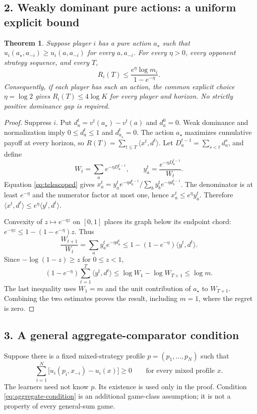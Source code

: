 \documentclass[11pt]{article}
\newtheorem{theorem}{Theorem}
\newcommand{\ip}[2]{\langle #1,#2\rangle}
\begin{document}
\subsection*{2. Weakly dominant pure actions: a uniform explicit bound}

\begin{theorem}\label{thm:dominance}
Suppose player $i$ has a pure action $a_\star$ such that
$u_i(a_\star,a_{-i})\geq u_i(a,a_{-i})$ for every $a,a_{-i}$.
For every $\eta>0$, every opponent strategy sequence, and every $T$,
\[
 R_i(T)\leq\frac{e^\eta\log m_i}{1-e^{-\eta}}.
\]
Consequently, if each player has such an action, the common explicit choice
$\eta=\log2$ gives $R_i(T)\leq4\log K$ for every player and horizon.
No strictly positive dominance gap is required.
\end{theorem}

\begin{proof}
Suppress $i$. Put $d_a^t=v^t(a_\star)-v^t(a)$ and $d_a^0=0$.
Weak dominance and normalization imply $0\leq d_a^t\leq1$ and
$d_{a_\star}^t=0$. The action $a_\star$ maximizes cumulative payoff at
every horizon, so $R(T)=\sum_{t\leq T}\ip{x^t}{d^t}$.
Let $D_a^{t-1}=\sum_{s<t}d_a^s$, and define
\[
 W_t=\sum_a e^{-\eta D_a^{t-1}},\qquad
 y_a^t=\frac{e^{-\eta D_a^{t-1}}}{W_t}.
\]
Equation \eqref{eq:telescoped} gives
$x_a^t=y_a^t e^{-\eta d_a^{t-1}}/\sum_b y_b^t e^{-\eta d_b^{t-1}}$.
The denominator is at least $e^{-\eta}$ and the numerator factor at most
one, hence $x_a^t\leq e^\eta y_a^t$. Therefore
$\ip{x^t}{d^t}\leq e^\eta\ip{y^t}{d^t}$.

Convexity of $z\mapsto e^{-\eta z}$ on $[0,1]$ places its graph below its
endpoint chord: $e^{-\eta z}\leq1-(1-e^{-\eta})z$. Thus
\[
 \frac{W_{t+1}}{W_t}=\sum_a y_a^t e^{-\eta d_a^t}
 \leq1-(1-e^{-\eta})\ip{y^t}{d^t}.
\]
Since $-\log(1-z)\geq z$ for $0\leq z<1$,
\[
 (1-e^{-\eta})\sum_{t=1}^T\ip{y^t}{d^t}
 \leq\log W_1-\log W_{T+1}\leq\log m.
\]
The last inequality uses $W_1=m$ and the unit contribution of
$a_\star$ to $W_{T+1}$. Combining the two estimates proves the result,
including $m=1$, where the regret is zero.
\end{proof}

\subsection*{3. A general aggregate-comparator condition}
Suppose there is a fixed mixed-strategy profile $p=(p_1,\ldots,p_N)$
such that
\begin{equation}\label{eq:aggregate-condition}
 \sum_{i=1}^N\bigl[u_i(p_i,x_{-i})-u_i(x)\bigr]\geq0
 \qquad\text{for every mixed profile }x.
\end{equation}
The learners need not know $p$. Its existence is used only in the proof.
Condition \eqref{eq:aggregate-condition} is an additional game-class
assumption; it is not a property of every general-sum game.
\end{document}

